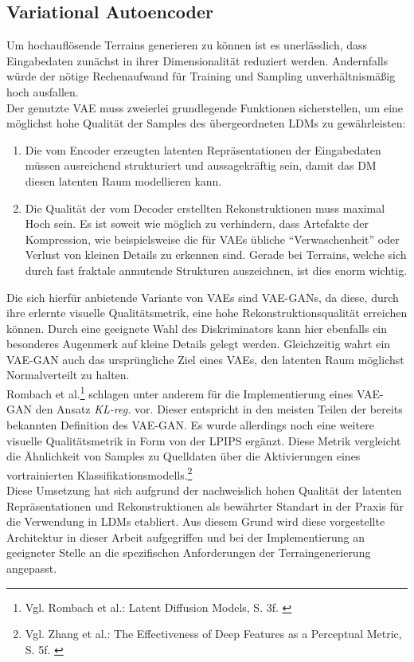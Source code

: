 \subsection {Variational Autoencoder}

Um hochauflösende Terrains generieren zu können ist es unerlässlich, dass Eingabedaten zunächst in ihrer Dimensionalität reduziert werden. Andernfalls würde der nötige Rechenaufwand für Training und Sampling unverhältnismäßig hoch ausfallen. \\
Der genutzte \ac{VAE} muss zweierlei grundlegende Funktionen sicherstellen, um eine möglichst hohe Qualität der Samples des übergeordneten \ac{LDM}s zu gewährleisten:
\begin{enumerate}
    \item Die vom Encoder erzeugten latenten Repräsentationen der Eingabedaten müssen ausreichend strukturiert und aussagekräftig sein, damit das \ac{DM} diesen latenten Raum modellieren kann.  
    \item Die Qualität der vom Decoder erstellten Rekonstruktionen muss maximal Hoch sein. Es ist soweit wie möglich zu verhindern, dass Artefakte der Kompression, wie beispielsweise die für \ac{VAE}s übliche \enquote{Verwaschenheit} oder Verlust von kleinen Details zu erkennen sind. Gerade bei Terrains, welche sich durch fast fraktale anmutende Strukturen auszeichnen, ist dies enorm wichtig.
\end{enumerate}
Die sich hierfür anbietende Variante von \ac{VAE}s sind VAE-GANs, da diese, durch ihre erlernte visuelle Qualitätsmetrik, eine hohe Rekonstruktionsqualität erreichen können. Durch eine geeignete Wahl des Diskriminators kann hier ebenfalls ein besonderes Augenmerk auf kleine Details gelegt werden. Gleichzeitig wahrt ein VAE-GAN auch das ursprüngliche Ziel eines \ac{VAE}s, den latenten Raum möglichst Normalverteilt zu halten. \\
Rombach et al.\footnote{
    Vgl. Rombach et al.: Latent Diffusion Models, S. 3f. 
    \cite{rombach2022high}
} schlagen unter anderem für die Implementierung eines VAE-GAN den Ansatz \textit{KL-reg.} vor. Dieser entspricht in den meisten Teilen der bereits bekannten Definition des VAE-GAN. Es wurde allerdings noch eine weitere visuelle Qualitätsmetrik in Form von der \ac{LPIPS} ergänzt. Diese Metrik vergleicht die Ähnlichkeit von Samples zu Quelldaten über die Aktivierungen eines vortrainierten Klassifikationsmodells.\footnote{
    Vgl. Zhang et al.: The Effectiveness of Deep Features as a Perceptual Metric, S. 5f. 
    \cite{zhang2018unreasonableeffectivenessdeepfeatures}
} \\
Diese Umsetzung hat sich aufgrund der nachweislich hohen Qualität der latenten Repräsentationen und Rekonstruktionen als bewährter Standart in der Praxis für die Verwendung in \ac{LDM}s etabliert. Aus diesem Grund wird diese vorgestellte Architektur in dieser Arbeit aufgegriffen und bei der Implementierung an geeigneter Stelle an die spezifischen Anforderungen der Terraingenerierung angepasst.

